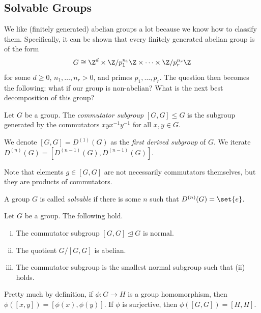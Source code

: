 \documentclass[10pt]{mypackage}
\begin{document}
\subsection{Solvable Groups}%
We like (finitely generated) abelian groups a lot because we know how to classify them. Specifically, it can be shown that every finitely generated abelian group is of the form
\begin{align*}
  G\cong \Z^{d}\times \Z/p_1^{n_1}\Z\times\cdots\times\Z/p_r^{n_r}\Z
\end{align*}
for some $d\geq 0$, $n_1,\dots,n_r > 0$, and primes $p_1,\dots,p_r$. The question then becomes the following: what if our group is non-abelian? What is the next best decomposition of this group?
\begin{definition}
  Let $G$ be a group. The \textit{commutator subgroup} $ \left[ G,G \right]\leq G $ is the subgroup generated by the commutators $xyx^{-1}y^{-1}$ for all $x,y\in G$.%

  We denote $\left[ G,G \right] = D^{(1)}(G)$ as the \textit{first derived subgroup} of $G$. We iterate $D^{(n)}(G) = \left[ D^{(n-1)}(G),D^{(n-1)}(G) \right]$.
\end{definition}
Note that elements $g\in \left[ G,G \right]$ are not necessarily commutators themselves, but they are products of commutators.
\begin{definition}
  A group $G$ is called \textit{solvable} if there is some $n$ such that $D^{(n)}(G) = \set{e}$.
\end{definition}
\begin{lemma}
  Let $G$ be a group. The following hold.
  \begin{enumerate}[(i)]
    \item The commutator subgroup $\left[ G,G \right]\trianglelefteq G$ is normal.
    \item The quotient $G/\left[ G,G \right]$ is abelian.
    \item The commutator subgroup is the smallest normal subgroup such that (ii) holds.
  \end{enumerate}
\end{lemma}
\begin{remark}
  Pretty much by definition, if $\phi\colon G\rightarrow H$ is a group homomorphism, then $\phi\left( \left[ x,y \right] \right) = \left[ \phi(x),\phi(y) \right]$. If $\phi$ is surjective, then $\phi\left( \left[ G,G \right] \right) = \left[ H,H \right]$.
\end{remark}
\end{document}
